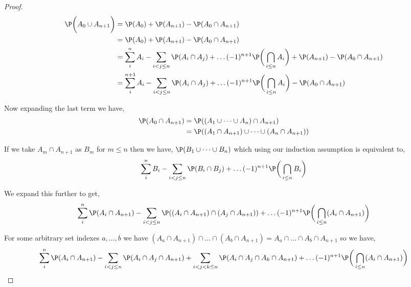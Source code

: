 \documentclass[a4paper]{report}
\begin{document}
\begin{proof}
\begin{align*}
    \P \bigg (  A_0  \cup A_{n + 1}\bigg ) &=  \P(A_0) + \P(A_{n + 1}) - \P(A_0 \cap A_{n + 1})\\
                                           &=  \P(A_0) + \P(A_{n + 1}) - \P(A_0 \cap A_{n + 1})\\
                                           &=  \sum_{i}^{n} A_i  -\sum_{i < j \le n} \P(A_i \cap A_j) + \dots (-1)^{n + 1} \P\bigg (\bigcap_{i \le n} A_i \bigg ) + \P(A_{n + 1}) - \P(A_0 \cap A_{n + 1})\\
                                           &=  \sum_{i}^{n + 1} A_i  -\sum_{i < j \le n} \P(A_i \cap A_j) + \dots (-1)^{n + 1} \P\bigg (\bigcap_{i \le n} A_i \bigg ) - \P(A_0 \cap A_{n + 1})\\
\end{align*}


Now expanding the last term we have,  
\begin{align*}
    \P(A_0 \cap A_{n + 1}) &= \P((A_1 \cup \dots \cup A_n) \cap A_{n + 1})\\
                           &= \P((A_1 \cap A_{n + 1}) \cup \dots \cup (A_n \cap A_{n + 1}))\\
\end{align*}


If we take $A_m \cap A_{n + 1}$ as $B_m$ for  $m \le n$ then we have, $\P(B_1 \cup \dots \cup B_n)$ which using our induction assumption is equivalent to, 
$$ \sum_{i}^{n} B_i  -\sum_{i < j \le n} \P(B_i \cap B_j) + \dots (-1)^{n + 1} \P\bigg (\bigcap_{i \le n} B_i \bigg )$$

We expand this further to get, 
    \begin{align*}
        \sum_{i}^{n} \P( A_i \cap A_{n + 1})  -\sum_{i < j \le n} \P((A_i \cap A_{n + 1}) \cap (A_j \cap A_{n + 1})) + \dots (-1)^{n + 1} \P\bigg (\bigcap_{i \le n} (A_i \cap A_{n + 1}) \bigg )\\
    \end{align*}

    For some arbitrary set indexes $a, \dots, b$ we have $(A_{a} \cap A_{n + 1}) \cap \dots \cap (A_b \cap A_{n + 1}) = A_a \cap \dots \cap A_b \cap A_{n + 1}$ so we have, 
    \begin{align*}
        \sum_{i}^{n} \P( A_i \cap A_{n + 1})  -\sum_{i < j \le n} \P(A_i \cap A_j \cap A_{n + 1}) + \sum_{i < j < k \le n} \P(A_i \cap A_j \cap A_k \cap A_{n + 1})+ \dots (-1)^{n + 1} \P\bigg (\bigcap_{i \le n} (A_i \cap A_{n + 1}) \bigg )\\
    \end{align*}



\end{proof}
\end{document}
